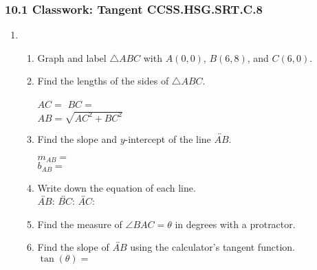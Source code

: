 \documentclass[12pt, twoside]{article}
\begin{document}
\subsubsection*{10.1 Classwork: Tangent \hfill CCSS.HSG.SRT.C.8}
\begin{enumerate}
  \item \begin{enumerate}
    \item Graph and label $\triangle ABC$ with $A(0,0)$, $B(6,8)$, and $C(6,0)$.
    \begin{center}
    \end{center}
    \item Find the lengths of the sides of $\triangle ABC$.
    \begin{multicols}{2}
      $AC=$ \hspace{3cm}
      $BC=$ \\[1cm]
      $AB=\sqrt{AC^2+BC^2}$
    \end{multicols} \vspace{1.75cm}
    \item Find the slope and $y$-intercept of the line $\overleftrightarrow{AB}$.
      \begin{multicols}{2}
        $m_{AB}=$ \\
        $b_{AB}=$
      \end{multicols}
    \item Write down the equation of each line. \\[0.5cm]
      $\overleftrightarrow{AB}$: \hfill
      $\overleftrightarrow{BC}$: \hfill
      $\overleftrightarrow{AC}$: \hspace{2cm}
    \vspace{1cm}
    \item Find the measure of $\angle BAC=\theta$ in degrees with a protractor. \vspace{0.5cm}
    \item Find the slope of $\overleftrightarrow{AB}$ using the calculator's tangent function.\\[0.25cm]
    $\displaystyle \tan(\theta)=$
  \end{enumerate}


\end{enumerate}
\end{document}
